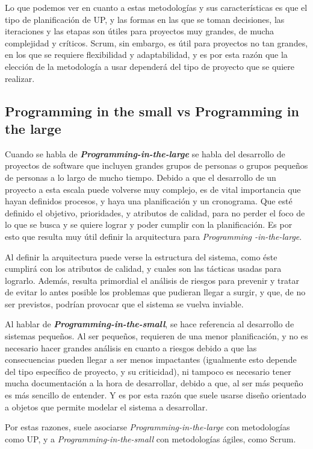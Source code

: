 Lo que podemos ver en cuanto a estas metodologías y sus características es que el tipo de planificación de UP, y las formas en las que se toman decisiones, las iteraciones y las etapas son útiles para proyectos muy grandes, de mucha complejidad y críticos. Scrum, sin embargo, es útil para proyectos no tan grandes, en los que se requiere flexibilidad y adaptabilidad, y es por esta razón que la elección de la metodología a usar dependerá del tipo de proyecto que se quiere realizar.


\subsection{Programming in the small vs Programming in the large}

Cuando se habla de \emph{\textbf{Programming-in-the-large}} se habla del desarrollo de proyectos de software que incluyen grandes grupos de personas o grupos pequeños de personas a lo largo de mucho tiempo.
Debido a que el desarrollo de un proyecto a esta escala puede volverse muy complejo, es de vital importancia que hayan definidos procesos, y haya una planificación y un cronograma. Que esté definido el objetivo, prioridades, y atributos de calidad, para no perder el foco de lo que se busca y se quiere lograr y poder cumplir con la planificación. 
Es por esto que resulta muy útil definir la arquitectura para \emph{Programming -in-the-large}.

Al definir la arquitectura puede verse la estructura del sistema, como éste cumplirá con los atributos de calidad, y cuales son las tácticas usadas para lograrlo.
Además, resulta primordial el análisis de riesgos para prevenir y tratar de evitar lo antes posible los problemas que pudieran llegar a surgir, y que, de no ser previstos, podrían provocar que el sistema se vuelva inviable.

Al hablar de \emph{\textbf{Programming-in-the-small}}, se hace referencia al desarrollo de sistemas pequeños. Al ser pequeños, requieren de una menor planificación, y no es necesario hacer grandes análisis en cuanto a riesgos debido a que las consecuencias  pueden llegar a ser menos impactantes (igualmente esto depende del tipo específico de proyecto, y su criticidad), ni tampoco es necesario tener mucha documentación a la hora de desarrollar, debido a que, al ser más pequeño es más sencillo de entender.
Y es por esta razón que suele usarse diseño orientado a objetos que permite modelar el sistema a desarrollar.

Por estas razones, suele asociarse \emph{Programming-in-the-large} con metodologías como UP, y a \emph{Programming-in-the-small} con metodologías ágiles, como Scrum.